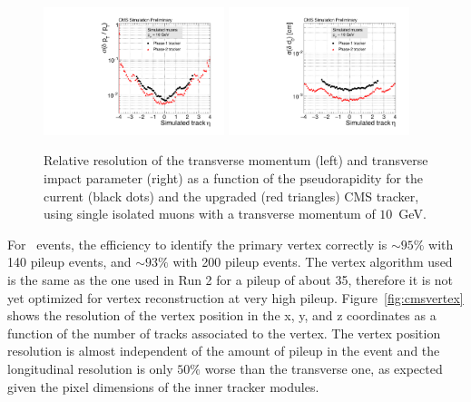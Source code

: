 \begin{figure}[h!tbp]
\begin{center}
  \includegraphics[width=0.47\textwidth]{figures/cmsupgrade/TDR-17-001_fig6_12_a_ptres_vs_eta_Sigma_vsPhase1.pdf} \hfill
  \includegraphics[width=0.47\textwidth]{figures/cmsupgrade/TDR-17-001_fig6_12_b_dxyres_vs_eta_Sigma_vsPhase1.pdf}
  \caption{ Relative resolution of the transverse momentum (left) and transverse impact parameter (right) as a function of the pseudorapidity for the current (black dots) and the upgraded (red triangles) CMS tracker, using single isolated muons with a transverse momentum of $10$~GeV. 
 }
  \label{fig:cmstrackres}
\end{center}
\end{figure}

For \ttbar~events, the efficiency to identify the primary vertex correctly is $\sim 95\%$ with 140 pileup events, and $\sim93\%$ with 200 pileup events. The vertex algorithm used is the
same as the one used in Run 2 for a pileup of about 35, therefore it is not yet optimized for vertex
reconstruction at very high pileup.
Figure~\ref{fig:cmsvertex} shows the resolution of the vertex position in the x, y, and z coordinates as a function of the number of tracks associated to the vertex. 
The vertex position resolution is almost independent of the amount of pileup in the event and the longitudinal resolution is only $50\%$
worse than the transverse one, as expected given the pixel dimensions of the inner tracker modules.

